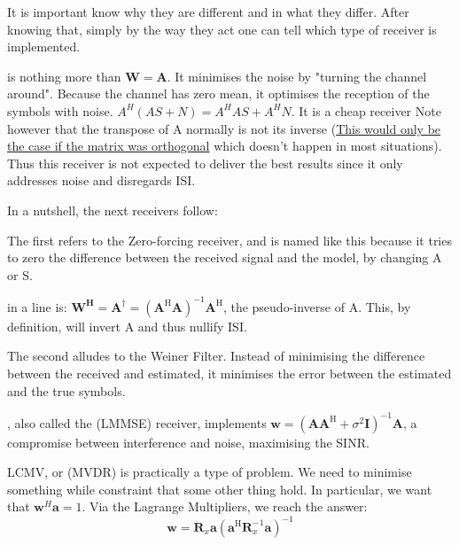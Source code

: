 \documentclass[12pt, a4paper]{article}
\begin{document}
\par It is important know why they are different and in what they differ. After knowing that, simply by the way they act one can tell which type of receiver is implemented.



 is nothing more than $\mathbf{W} = \mathbf{A}$. It minimises the noise by "turning the channel around". Because the channel has zero mean, it optimises the reception of the symbols with noise. $A^H (AS + N) = A^H AS + A^H N$.
It is a cheap receiver 
Note however that the transpose of A normally is not its inverse (\uline{This would only be the case if the matrix was orthogonal} which doesn't happen in most situations). Thus this receiver is not expected to deliver the best results since it only addresses noise and disregards ISI.


\vspace{.5cm}
In a nutshell, the next receivers follow:


The first refers to the Zero-forcing receiver, and is named like this because it tries to zero the difference between the received signal and the model, by changing A or S.

 in a line is: $\mathbf{W^H} = \mathbf{A}^\dagger = (\mathbf{A}^\text{H}\mathbf{A})^{-1} \mathbf{A}^\text{H}$, the pseudo-inverse of A. This, by definition, will invert A and thus nullify ISI.


\vspace{.5cm}

The second alludes to the Weiner Filter. Instead of minimising the difference between the received and estimated, it minimises the error between the estimated and the true symbols.

, also called the  (LMMSE) receiver, implements $\mathbf{w} = (\mathbf{AA}^\text{H} + \sigma^2 \mathbf{I})^{-1} \mathbf{A}$, a compromise between interference and noise, maximising the SINR.




 LCMV, or  (MVDR) is practically a type of problem. We need to minimise something while constraint that some other thing hold. 
In particular, we want that $\mathbf{w}^H \mathbf{a} = 1$. Via the Lagrange Multipliers, we reach the answer: 
\begin{equation}
    \mathbf{w} = \mathbf{R}_x \mathbf{a} (\mathbf{a}^\text{H} \mathbf{R}_x^{-1}\mathbf{a})^{-1}
\end{equation}
\end{document}
